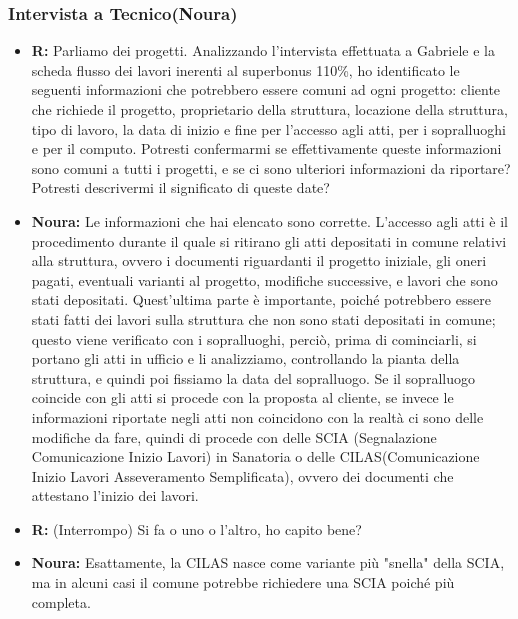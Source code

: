\documentclass{elegantbook}
\begin{document}
	\subsubsection{Intervista a Tecnico(Noura)}
	\begin{itemize}
		\item \textbf{R:} Parliamo dei progetti. Analizzando l'intervista effettuata a Gabriele e la scheda flusso dei lavori inerenti al superbonus 110\%, ho
                    identificato le seguenti informazioni che potrebbero essere comuni ad ogni progetto: cliente che richiede il progetto, proprietario della struttura,
                    locazione della struttura, tipo di lavoro, la data di inizio e fine per l'accesso agli atti, per i sopralluoghi e  per il computo. Potresti confermarmi se effettivamente queste informazioni sono comuni a tutti i progetti, e se ci sono ulteriori informazioni da
                    riportare? Potresti descrivermi il significato di queste date?
		\item \textbf{Noura:} Le informazioni che hai elencato sono corrette. L'accesso agli atti è il procedimento durante il quale si ritirano gli atti depositati
                    in comune relativi alla struttura, ovvero i documenti riguardanti il progetto iniziale, gli oneri pagati, eventuali varianti al progetto, modifiche
                    successive, e lavori che sono stati depositati. Quest'ultima parte è importante, poiché potrebbero essere stati fatti dei lavori sulla struttura che non
                    sono stati depositati in comune; questo viene verificato con i sopralluoghi, perciò, prima di cominciarli, si portano gli atti in ufficio e li analizziamo,
                    controllando la pianta della struttura, e quindi poi fissiamo la data del sopralluogo. Se il sopralluogo coincide con gli atti si procede con la proposta
                    al cliente, se invece le informazioni riportate negli atti non coincidono con la realtà ci sono delle modifiche da fare, quindi di procede con delle
                    SCIA (Segnalazione Comunicazione Inizio Lavori) in Sanatoria o delle CILAS(Comunicazione Inizio Lavori Asseveramento Semplificata), ovvero dei documenti
                    che attestano l'inizio dei lavori.
		\item \textbf{R:} (Interrompo) Si fa o uno o l'altro, ho capito bene?
		\item \textbf{Noura:} Esattamente, la CILAS nasce come variante più "snella" della SCIA, ma in alcuni casi il comune potrebbe richiedere una SCIA poiché più
                    completa.

\end{itemize}
\end{document}
